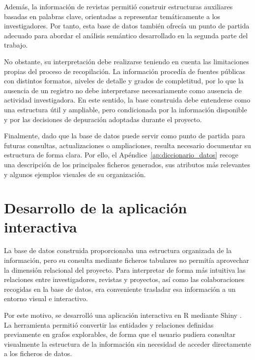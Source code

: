 \documentclass[11pt,spanish,listoffigures,listoftables]{tfgetsinf}
\begin{document}
Además, la información de revistas permitió construir estructuras auxiliares basadas en palabras clave, orientadas a representar temáticamente a los investigadores. Por tanto, esta base de datos también ofrecía un punto de partida adecuado para abordar el análisis semántico desarrollado en la segunda parte del trabajo.

No obstante, su interpretación debe realizarse teniendo en cuenta las limitaciones propias del proceso de recopilación. La información procedía de fuentes públicas con distintos formatos, niveles de detalle y grados de completitud, por lo que la ausencia de un registro no debe interpretarse necesariamente como ausencia de actividad investigadora. En este sentido, la base construida debe entenderse como una estructura útil y ampliable, pero condicionada por la información disponible y por las decisiones de depuración adoptadas durante el proyecto.

Finalmente, dado que la base de datos puede servir como punto de partida para futuras consultas, actualizaciones o ampliaciones, resulta necesario documentar su estructura de forma clara. Por ello, el Apéndice~\ref{ap:diccionario_datos} recoge una descripción de los principales ficheros generados, sus atributos más relevantes y algunos ejemplos visuales de su organización.



\chapter{Desarrollo de la aplicación interactiva}

La base de datos construida proporcionaba una estructura organizada de la información, pero su consulta mediante ficheros tabulares no permitía aprovechar la dimensión relacional del proyecto. Para interpretar de forma más intuitiva las relaciones entre investigadores, revistas y proyectos, así como las colaboraciones recogidas en la base de datos, era conveniente trasladar esa información a un entorno visual e interactivo.

Por este motivo, se desarrolló una aplicación interactiva en R mediante Shiny \cite{shiny}. La herramienta permitió convertir las entidades y relaciones definidas previamente en grafos explorables, de forma que el usuario pudiera consultar visualmente la estructura de la información sin necesidad de acceder directamente a los ficheros de datos.
\end{document}
